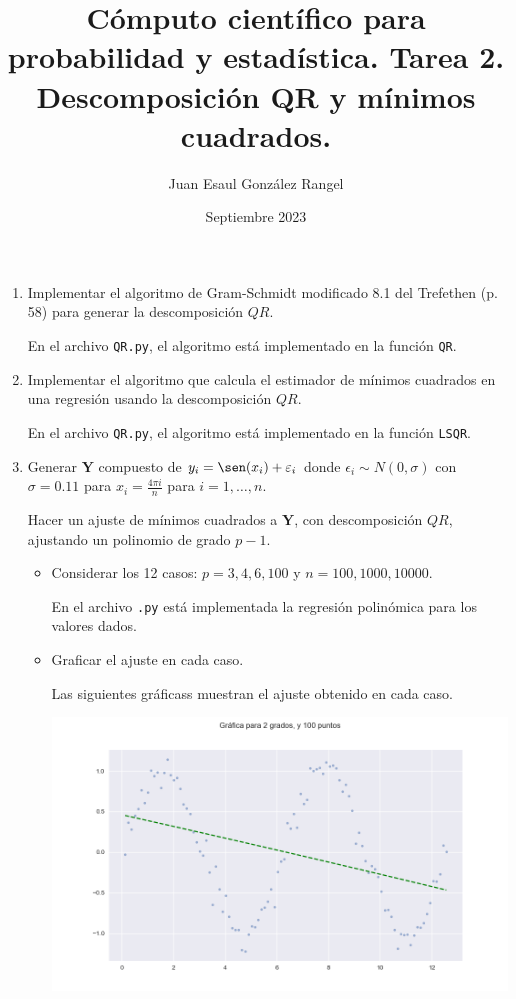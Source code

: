 \documentclass{article}
\title{Cómputo científico para probabilidad y estadística. Tarea 2.\\
Descomposición QR y mínimos cuadrados.}
\author{Juan Esaul González Rangel}
\date{Septiembre 2023}
\begin{document}
\maketitle


\begin{enumerate}

    \item Implementar el algoritmo de Gram-Schmidt modificado 8.1 del Trefethen (p. 58) para generar 
    la descomposición $QR$.

    En el archivo \texttt{QR.py}, el algoritmo está implementado en la función \texttt{QR}. 

    \item Implementar el algoritmo que calcula el estimador de mínimos cuadrados
    en una regresión usando la descomposición $QR$.

    En el archivo \texttt{QR.py}, el algoritmo está implementado en la función \texttt{LSQR}. 

    \item Generar $\mathbf Y$ compuesto de $y_i = \sen(x_i) + \epsilon_i$ donde 
    $\epsilon_i \sim N (0, \sigma)$ con $\sigma = 0.11$ para $x_i = \frac{4\pi i}n$ para 
    $i = 1, \dots , n$.

    Hacer un ajuste de mínimos cuadrados a $\mathbf Y$, con descomposición $QR$, ajustando un polinomio 
    de grado $p - 1$.

    \begin{itemize}
        \item Considerar los 12 casos: $p = 3, 4, 6, 100$ y $n = 100, 1000, 10000$.
        
        En el archivo \texttt{.py} está implementada la regresión polinómica para los valores
        dados.

        \item Graficar el ajuste en cada caso.
        
        Las siguientes gráficass muestran el ajuste obtenido en cada caso.

       \begin{center}
            \includegraphics[width=\textwidth]{Ajuste2100.png}
       

\end{center}
\end{itemize}
\end{enumerate}
\end{document}
